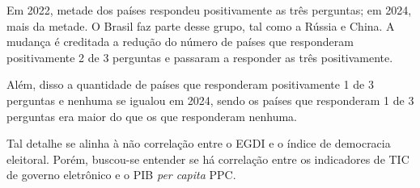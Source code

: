 Em 2022, metade dos países respondeu positivamente as três perguntas; em 2024, mais da metade. O Brasil faz parte desse grupo, tal como a Rússia e China. A mudança é creditada a redução do número de países que responderam positivamente 2 de 3 perguntas e passaram a responder as três positivamente. 

Além, disso a quantidade de países que responderam positivamente 1 de 3 perguntas e nenhuma se igualou em 2024, sendo os países que responderam 1 de 3 perguntas era maior do que os que responderam nenhuma.

Tal detalhe se alinha à não correlação entre o EGDI e o índice de democracia eleitoral. Porém, buscou-se entender se há correlação entre os indicadores de TIC de governo eletrônico e o PIB \textit{per capita} PPC.